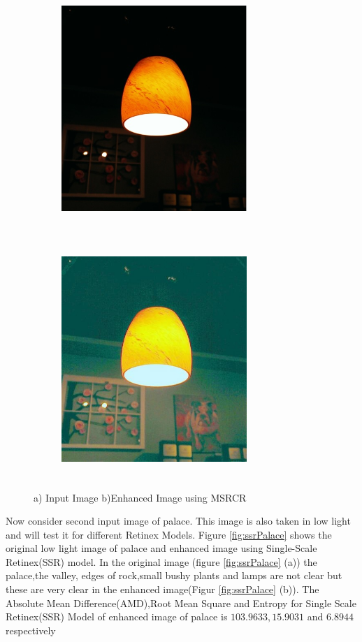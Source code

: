 \begin{figure}[!htb]
	\begin{subfigure}{8cm}
		\centering    
    	\includegraphics[width=7cm,height=9cm,keepaspectratio]{images/ch5/bulb_input.jpg}
    	\caption{} 
    \end{subfigure}
  	\begin{subfigure}{6cm}
  		\centering
  		\includegraphics[width=7cm,height=9cm,keepaspectratio]{images/ch5/bulb_msrcr.jpg}
   		\caption{}
  	\end{subfigure}
  	\caption{a) Input Image b)Enhanced Image using MSRCR}
  	\label{fig:msrcr}
\end{figure}


Now consider second input image of palace. This image is also taken in low light and will test it for different Retinex Models. Figure \ref{fig:ssrPalace} shows the original low light image of palace and enhanced image using Single-Scale Retinex(SSR) model. In the original image (figure \ref{fig:ssrPalace} (a))  the palace,the valley, edges of rock,small bushy plants and lamps are not clear but these are very clear in the enhanced image(Figur \ref{fig:ssrPalace} (b)). The Absolute Mean Difference(AMD),Root Mean Square and Entropy for Single Scale Retinex(SSR) Model of enhanced image of palace is $103.9633,15.9031$ and $6.8944$ respectively      

